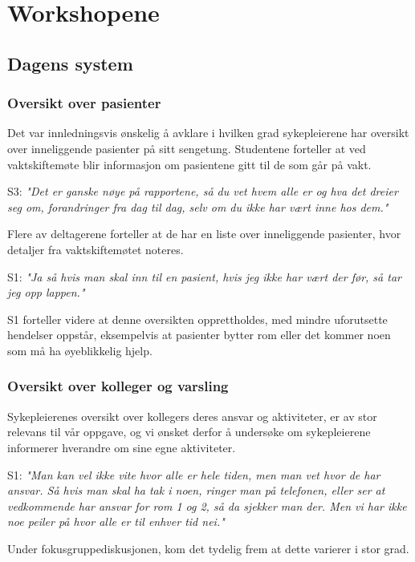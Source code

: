 \section{Workshopene}
\label{ws}


\subsection{Dagens system}

\subsubsection{Oversikt over pasienter}
Det var innledningsvis ønskelig å avklare i hvilken grad sykepleierene har oversikt over inneliggende pasienter på sitt sengetung. Studentene forteller at ved vaktskiftemøte blir informasjon om pasientene gitt til de som går på vakt.

\noindent
S3: \emph{"Det er ganske nøye på rapportene, så du vet hvem alle er og hva det dreier seg om, forandringer fra dag til dag, selv om du ikke har vært inne hos dem."}

\noindent
Flere av deltagerene forteller at de har en liste over inneliggende pasienter, hvor detaljer fra vaktskiftemøtet noteres.

\noindent
S1: \emph{"Ja så hvis man skal inn til en pasient, hvis jeg ikke har vært der før, så tar jeg opp lappen."}

\noindent
S1 forteller videre at denne oversikten opprettholdes, med mindre uforutsette hendelser oppstår, eksempelvis at pasienter bytter rom eller det kommer noen som må ha øyeblikkelig hjelp.
 
 
\subsubsection{Oversikt over kolleger og varsling}
Sykepleierenes oversikt over kollegers deres ansvar og aktiviteter, er av stor relevans til vår oppgave, og vi ønsket derfor å undersøke om sykepleierene informerer hverandre om sine egne aktiviteter.

\noindent
S1: \emph{"Man kan vel ikke vite hvor alle er hele tiden, men man vet hvor de har ansvar. Så hvis man skal ha tak i noen, ringer man på telefonen, eller ser at vedkommende har ansvar for rom 1 og 2, så da sjekker man der. Men vi har ikke noe peiler på hvor alle er til enhver tid nei."} 

\noindent
Under fokusgruppediskusjonen, kom det tydelig frem at dette varierer i stor grad.


